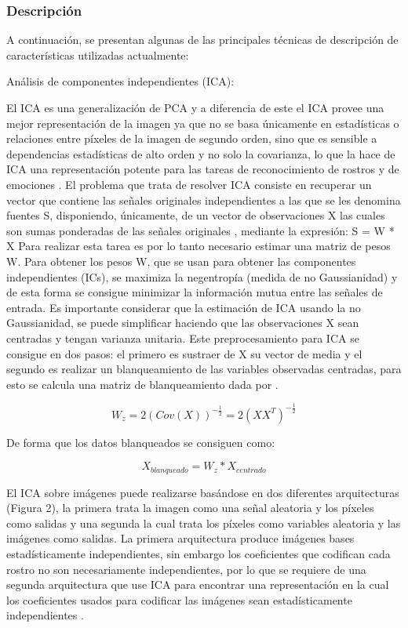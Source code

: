 \subsubsection{Descripción}
A continuación, se presentan algunas de las principales técnicas de descripción de características utilizadas actualmente:

\begin{enumerate}
{\bf\item Análisis de componentes independientes (ICA):} \vskip 0.1cm
El ICA es una generalización de PCA y a diferencia de este el ICA provee una mejor representación de la imagen ya que no se basa únicamente en estadísticas o relaciones entre píxeles de la imagen de segundo orden, sino que es sensible a dependencias estadísticas de alto orden y no solo la covarianza, lo que la hace de ICA una representación potente para las tareas de reconocimiento de rostros y de emociones \citep{Willian}. 
\vskip 0.1cm
El problema que trata de resolver ICA consiste en recuperar un vector que contiene las señales originales independientes a las que se les denomina fuentes S, disponiendo, únicamente, de un vector de observaciones X las cuales son sumas ponderadas de las señales originales \citep{Damian}, mediante la expresión:  S = W * X
\vskip 0.1cm
Para realizar esta tarea es por lo tanto necesario estimar una matriz de pesos W. Para obtener los pesos W, que se usan para obtener las componentes independientes (ICs), se maximiza la negentropía (medida de no Gaussianidad) y de esta forma se consigue minimizar la información mutua entre las señales de entrada. Es importante considerar que la estimación de ICA usando la no Gaussianidad, se puede simplificar haciendo que las observaciones X sean centradas y tengan varianza unitaria. Este preprocesamiento para ICA se consigue en dos pasos: el primero es sustraer de X su vector de media y el segundo es realizar un blanqueamiento de las variables observadas centradas, para esto se calcula una matriz de blanqueamiento dada por \citep{Damian}.

\begin{equation}
W_{z}={2(Cov(X))}^{-\frac{1}{2}}=2(XX^{T})^{-\frac{1}{2}}
\end{equation}

De forma que los datos blanqueados se consiguen como:

\begin{equation}
X_{blanqueado}=W_{z}*X_{centrado}
\end{equation}

El ICA sobre imágenes puede realizarse basándose en dos diferentes arquitecturas (Figura 2), la primera trata la imagen como una señal aleatoria y los píxeles como salidas y una segunda la cual trata los píxeles como variables aleatoria y las imágenes como salidas. La primera arquitectura produce imágenes bases estadísticamente independientes, sin embargo los coeficientes que codifican cada rostro no son necesariamente independientes, por lo que se requiere de una segunda arquitectura que use ICA para encontrar una representación en la cual los coeficientes usados para codificar las imágenes sean estadísticamente independientes \citep{Willian}.


\end{enumerate}
